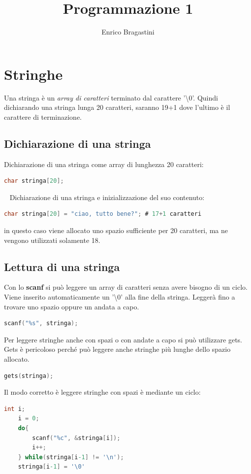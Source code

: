 \documentclass[a4paper,11pt,oneside]{book}
\title{\Large{\textbf{Programmazione 1}}}
\author{Enrico Bragastini}
\begin{document}
\pagestyle{fancy}
\fancyhf{}
\rhead{}
\lhead{\nouppercase\leftmark}
\cfoot{\thepage}
\frontmatter

\maketitle
\tableofcontents

\mainmatter
\chapter{Stringhe}
Una stringa è un \emph{array di caratteri} terminato dal carattere '\textbackslash0'.
Quindi dichiarando una stringa lunga 20 caratteri, saranno 19+1 dove l'ultimo è il carattere di terminazione.

\section{Dichiarazione di una stringa}
Dichiarazione di una stringa come array di lunghezza 20 caratteri:
\begin{lstlisting}[language=C]
    char stringa[20]; 
\end{lstlisting}

~\newline
Dichiarazione di una stringa e inizializzazione del suo contenuto:
\begin{lstlisting}[language=C]
    char stringa[20] = "ciao, tutto bene?"; # 17+1 caratteri
\end{lstlisting}
in questo caso viene allocato uno spazio sufficiente per 20 caratteri, ma ne vengono utilizzati solamente 18.

\section{Lettura di una stringa}
Con lo \textbf{scanf} si può leggere un array di caratteri senza avere bisogno di un ciclo. Viene inserito automaticamente 
un '\textbackslash0' alla fine della stringa. Leggerà fino a trovare uno spazio oppure un andata a capo.

\begin{lstlisting}[language=C]
    scanf("%s", stringa);
\end{lstlisting}
Per leggere stringhe anche con spazi o con andate a capo si può utilizzare gets. Gets è pericoloso perché può leggere anche stringhe più lunghe dello spazio allocato.
\begin{lstlisting}[language=C]
    gets(stringa);
\end{lstlisting}
Il modo corretto è leggere stringhe con spazi è mediante un ciclo:
\begin{lstlisting}[language=C]
    int i;
    i = 0;
    do{
        scanf("%c", &stringa[i]);
        i++;
    } while(stringa[i-1] != '\n');
    stringa[i-1] = '\0'
\end{lstlisting}
\end{document}
